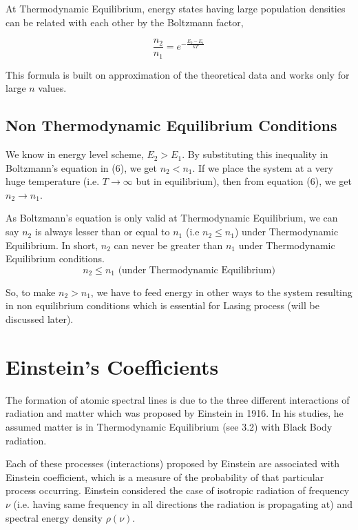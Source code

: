 \documentclass[12pt]{article}
\begin{document}
At Thermodynamic Equilibrium, energy states having large population densities can be related with each other by the Boltzmann factor,

\begin{equation}
    \frac{n_{2}}{n_{1}} = e^{-\frac{E_{2} - E_{1}}{kT}}
\end{equation}

This formula is built on approximation of the theoretical data and works only for large $n$ values.

\subsection{Non Thermodynamic Equilibrium Conditions}

We know in energy level scheme, $E_{2} > E_{1}$. By substituting this inequality in Boltzmann's equation in (6), we get $n_{2} < n_{1}$. If we place the system at a very huge temperature (i.e. $T \rightarrow \infty$ but in equilibrium), then from equation (6), we get $n_{2} \rightarrow n_{1}$. \vspace{.2cm}

As Boltzmann's equation is only valid at Thermodynamic Equilibrium, we can say $n_{2}$ is always lesser than or equal to $n_{1}$ (i.e $n_{2} \le n_{1}$) under Thermodynamic Equilibrium. In short, $n_{2}$ can never be greater than $n_{1}$ under Thermodynamic Equilibrium conditions. 
\begin{equation*}
    n_{2} \le n_{1} \text{ (under Thermodynamic Equilibrium)}
\end{equation*}

So, to make $n_{2} > n_{1}$, we have to feed energy in other ways to the system resulting in non equilibrium conditions which is essential for Lasing process (will be discussed later). 

\section{Einstein's Coefficients}

The formation of atomic spectral lines is due to the three different interactions of radiation and matter which was proposed by Einstein in 1916. In his studies, he assumed matter is in Thermodynamic Equilibrium (see 3.2) with Black Body radiation. \vspace{.2cm}

Each of these processes (interactions) proposed by Einstein are associated with Einstein coefficient, which is a measure of the probability of that particular process occurring. Einstein considered the case of isotropic radiation of frequency $\nu$ (i.e. having same frequency in all directions the radiation is propagating at) and spectral energy density $\rho(\nu)$. \vspace{.2cm}
\end{document}
